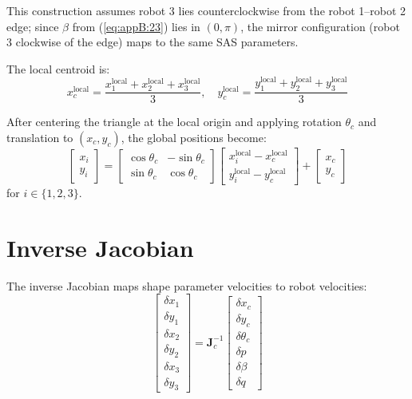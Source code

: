 This construction assumes robot 3 lies counterclockwise from the robot 1--robot 2 edge; since $\beta$ from (\ref{eq:appB:23}) lies in $(0, \pi)$, the mirror configuration (robot 3 clockwise of the edge) maps to the same SAS parameters.

The local centroid is:
\begin{equation}\label{eq:appB:28}
x_c^{\text{local}} = \frac{x_1^{\text{local}} + x_2^{\text{local}} + x_3^{\text{local}}}{3}, \quad y_c^{\text{local}} = \frac{y_1^{\text{local}} + y_2^{\text{local}} + y_3^{\text{local}}}{3}
\end{equation}

After centering the triangle at the local origin and applying rotation $\theta_c$ and translation to $(x_c, y_c)$, the global positions become:
\begin{equation}\label{eq:appB:29}
\begin{bmatrix} x_i \\ y_i \end{bmatrix} = \begin{bmatrix} \cos\theta_c & -\sin\theta_c \\ \sin\theta_c & \cos\theta_c \end{bmatrix} \begin{bmatrix} x_i^{\text{local}} - x_c^{\text{local}} \\ y_i^{\text{local}} - y_c^{\text{local}} \end{bmatrix} + \begin{bmatrix} x_c \\ y_c \end{bmatrix}
\end{equation}
for $i \in \{1, 2, 3\}$.

\section{Inverse Jacobian}

The inverse Jacobian maps shape parameter velocities to robot velocities:
\begin{equation}\label{eq:appB:30}
\begin{bmatrix}
\delta x_1 \\ \delta y_1 \\ \delta x_2 \\ \delta y_2 \\ \delta x_3 \\ \delta y_3
\end{bmatrix} =
\mathbf{J}_c^{-1}
\begin{bmatrix}
\delta x_c \\ \delta y_c \\ \delta \theta_c \\ \delta p \\ \delta \beta \\ \delta q
\end{bmatrix}
\end{equation}

